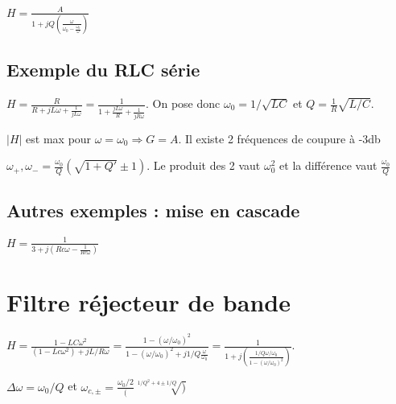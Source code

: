 \documentclass[french]{yLectureNote}
\begin{document}
\(H = \frac{A}{1+jQ(\frac{\omega}{\omega_0 - \frac{\omega_0}{\omega}})}\)
\subsection{Exemple du RLC série}
\(H = \frac{R}{R+jL\omega + \frac{1}{jL\omega}} = \frac{1}{1+\frac{jL\omega}{R}+\frac{1}{jR\omega}}\). On pose donc \(\omega_0 = 1/\sqrt{LC}\) et \(Q = \frac{1}{R}\sqrt{L/C}\).

\(|H|\) est max pour \(\omega = \omega_0 \Rightarrow G = A\). Il existe 2 fréquences de coupure à -3db

\(\omega_+, \omega_- = \frac{\omega_0}{Q} (\sqrt{1+Q'}\pm 1)\). Le produit des 2 vaut \(\omega_0^2\) et la différence vaut \(\frac{\omega_0}{Q}\)
\subsection{Autres exemples : mise en cascade}
\(H = \frac{1}{3+j(Rc\omega-\frac{1}{Rc\omega})}\)
\section{Filtre réjecteur de bande}
\(H = \frac{1-LC\omega^2}{(1-Lc\omega^2)+jL/R \omega} = \frac{1-(\omega/\omega_0)^2}{1-(\omega/\omega_0)^2+j1/Q \frac{\omega}{\omega_0}} = \frac{1}{1+j(\frac{1/Q \omega/\omega_0}{1-(\omega/\omega_0)^2})}\).

\(\Delta \omega = \omega_0/Q\) et \(\omega_{c,\pm} = \frac{\omega_0/2}(\sqrt[1/Q^2+4\pm 1/Q])\)
\end{document}
